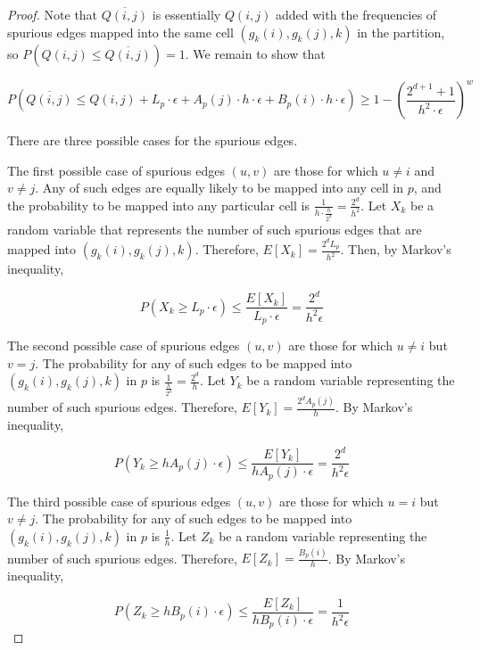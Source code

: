 \begin{proof}
  Note that $\overline{Q(i,j)}$ is essentially $Q(i,j)$ added with the frequencies of spurious edges mapped into the same cell $(g_k(i),g_k(j),k)$ in the partition, so $P(Q(i,j) \leq \overline{Q(i,j)}) = 1$. We remain to show that

\[
P(\overline{Q(i,j)} \leq Q(i,j) + L_p \cdot \epsilon + A_p(j) \cdot h \cdot \epsilon + B_p(i) \cdot h \cdot \epsilon) \geq 1-(\frac{2^{d+1}+1}{h^2\cdot\epsilon})^w
\]

  There are three possible cases for the spurious edges.
  
The first possible case of spurious edges $(u,v)$ are those for which $u \neq i$ and $v \neq j$. Any of such edges are equally likely to be mapped into any cell in $p$, and the probability to be mapped into any particular cell is $\frac{1}{h \cdot \frac{h}{2^d}} = \frac{2^d}{h^2}$. Let $X_k$ be a random variable that represents the number of such spurious edges that are mapped into $(g_k(i),g_k(j),k)$. Therefore, $E[X_k] = \frac{2^dL_p}{h^2}$. Then, by Markov's inequality,

\begin{equation} \label{efreq1}
P(X_k \geq L_p \cdot \epsilon) \leq \frac{E[X_k]}{L_p \cdot \epsilon} = \frac{2^d}{h^2\epsilon}
\end{equation}

The second possible case of spurious edges $(u,v)$ are those for which $u \neq i$ but $v=j$. The probability for any of such edges to be mapped into $(g_k(i),g_k(j),k)$ in $p$ is $\frac{1}{\frac{h}{2^d}} = \frac{2^d}{h}$. Let $Y_k$ be a random variable representing the number of such spurious edges. Therefore, $E[Y_k] = \frac{2^dA_p(j)}{h}$. By Markov's inequality,

\begin{equation} \label{efreq2}
P(Y_k \geq h A_p(j) \cdot \epsilon) \leq \frac{E[Y_k]}{h A_p(j) \cdot \epsilon} = \frac{2^d}{h^2\epsilon}
\end{equation}

The third possible case of spurious edges $(u,v)$ are those for which $u=i$ but $v \neq j$. The probability for any of such edges to be mapped into $(g_k(i),g_k(j),k)$ in $p$ is $\frac{1}{h}$. Let $Z_k$ be a random variable representing the number of such spurious edges. Therefore, $E[Z_k] = \frac{B_p(i)}{h}$. By Markov's inequality,

\begin{equation} \label{efreq3}
P(Z_k \geq h B_p(i) \cdot \epsilon) \leq \frac{E[Z_k]}{h B_p(i) \cdot \epsilon} = \frac{1}{h^2\epsilon}
\end{equation}


\end{proof}
